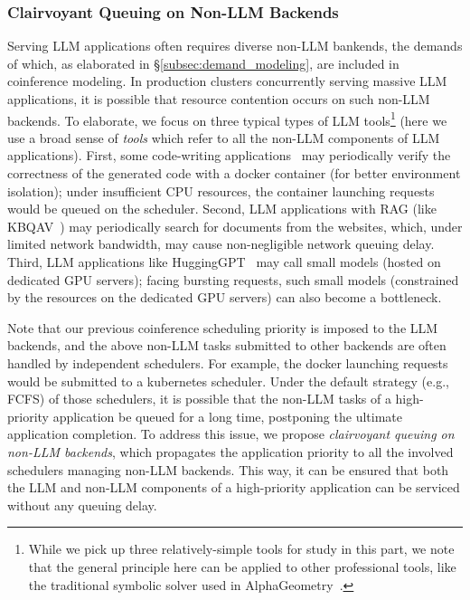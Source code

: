 \subsubsection{Clairvoyant Queuing on Non-LLM Backends}
\label{subsubsec:queuing}
Serving LLM applications often requires diverse non-LLM bankends, the demands of which, as elaborated in \S\ref{subsec:demand_modeling}, are included in coinference modeling.
In production clusters concurrently serving massive LLM applications, it is possible that resource contention occurs on such non-LLM backends.
To elaborate, we focus on three typical types of LLM tools\footnote{
    While we pick up three relatively-simple tools for study in this part, we note that the general principle here can be applied to other professional tools, like the traditional symbolic solver used in AlphaGeometry~\cite{AlphaGeometry}.
}
(here we use a broad sense of \emph{tools} which refer to all the non-LLM components of LLM applications).
First, some code-writing applications~\cite{factool_code} may periodically verify the correctness of the generated code with a docker container (for better environment isolation); under insufficient CPU resources, the container launching requests would be queued on the scheduler. 
Second, LLM applications with RAG (like KBQAV~\cite{factool_kbqa}) may periodically search for documents from the websites, which, under limited network bandwidth, may cause non-negligible network queuing delay.
Third, LLM applications like HuggingGPT~\cite{hugginggpt} may call small models (hosted on dedicated GPU servers); facing bursting requests, such small models (constrained by the resources on the dedicated GPU servers) can also become a bottleneck. 

Note that our previous coinference scheduling priority is imposed to the LLM backends, and the above non-LLM tasks submitted to other backends are often handled by independent schedulers. %
For example, the docker launching requests would be submitted to a kubernetes scheduler.
Under the default strategy (e.g., FCFS) of those schedulers, it is possible that the non-LLM tasks of a high-priority application be queued for a long time, postponing the ultimate application completion.
To address this issue, we propose \emph{clairvoyant queuing on non-LLM backends}, which propagates the application priority to all the involved schedulers managing non-LLM backends.
This way, it can be ensured that both the LLM and non-LLM components of a high-priority application can be serviced without any queuing delay. 

